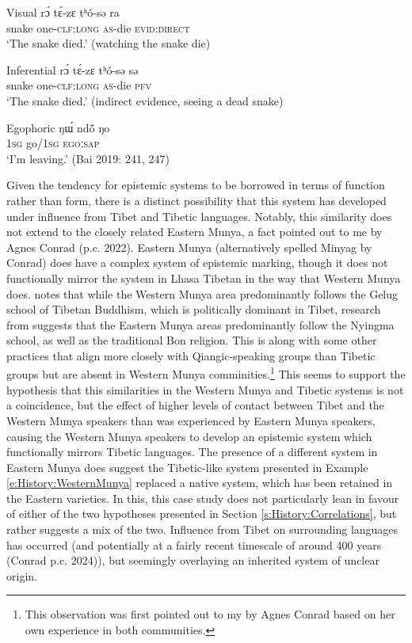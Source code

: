 \begin{exe}\label{e:History:WesternMunya}
\ex Visual
\gll rɔ́ tɛ́-zɛ tʰó-sə ra \\
snake one-\textsc{clf:long} \textsc{as}-die \textsc{evid:direct} \\
\glt ‘The snake died.’ (watching the snake die)

\ex Inferential
\gll rɔ́ tɛ́-zɛ tʰó-sə sə \\
snake one-\textsc{clf:long} \textsc{as}-die \textsc{pfv} \\
\glt ‘The snake died.’ (indirect evidence, seeing a dead snake)

\ex Egophoric
\gll ŋɯ́ ndö́ ŋo \\
\textsc{1sg} go/\textsc{1sg} \textsc{egoːsap} \\
\glt ‘I’m leaving.’
(Bai 2019: 241, 247)
\end{exe}

Given the tendency for epistemic systems to be borrowed in terms of function rather than form, there is a distinct possibility that this system has developed under influence from Tibet and Tibetic languages. Notably, this similarity does not extend to the closely related Eastern Munya, a fact pointed out to me by Agnes Conrad (p.c. 2022). Eastern Munya (alternatively spelled Minyag by Conrad) does have a complex system of epistemic marking, though it does not functionally mirror the system in Lhasa Tibetan in the way that Western Munya does. \cite{Bai2019} notes that while the Western Munya area predominantly follows the Gelug school of Tibetan Buddhism, which is politically dominant in Tibet, research from \cite{Li2006} suggests that the Eastern Munya areas predominantly follow the Nyingma school, as well as the traditional Bon religion. This is along with some other practices that align more closely with Qiangic-speaking groups than Tibetic groups but are absent in Western Munya comminities.\footnote{This observation was first pointed out to my by Agnes Conrad based on her own experience in both communities.} This seems to support the hypothesis that this similarities in the Western Munya and Tibetic systems is not a coincidence, but the effect of higher levels of contact between Tibet and the Western Munya speakers than was experienced by Eastern Munya speakers, causing the Western Munya speakers to develop an epistemic system which functionally mirrors Tibetic languages. The presence of a different system in Eastern Munya does suggest the Tibetic-like system presented in Example \ref{e:History:WesternMunya} replaced a native system, which has been retained in the Eastern varieties. In this, this case study does not particularly lean in favour of either of the two hypotheses presented in Section \ref{s:History:Correlations}, but rather suggests a mix of the two. Influence from Tibet on surrounding languages has occurred (and potentially at a fairly recent timescale of around 400 years (Conrad p.c. 2024)), but seemingly overlaying an inherited system of unclear origin.

